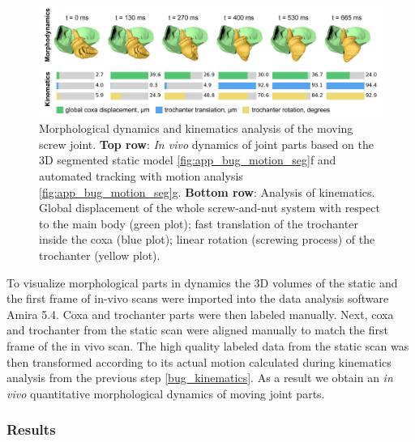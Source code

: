 \begin{figure}[ht]
  \centerline{
    \includegraphics[scale = 0.228]{figures/app_bug_kinematics.PNG} 
  }  
  \caption{Morphological dynamics and kinematics analysis of the moving screw joint. \textbf{Top row}: \textit{In vivo} dynamics of joint parts based on the 3D segmented static model \ref{fig:app_bug_motion_seg}f and automated tracking with motion analysis \ref{fig:app_bug_motion_seg}g. \textbf{Bottom row}: Analysis of kinematics. Global
displacement of the whole screw-and-nut system with respect to the main body (green plot); fast translation of the trochanter inside the coxa (blue plot);
linear rotation (screwing process) of the trochanter (yellow plot).}
  \label{fig:app_bug_kinematics}
\end{figure}

To visualize morphological parts in dynamics the 3D volumes of the static and the first frame of in-vivo scans were imported into the data analysis software Amira 5.4. Coxa and trochanter parts were then labeled manually. Next, coxa and trochanter from the static scan were aligned manually to match the first frame of the in vivo scan. The high quality labeled data from the static scan was then transformed according to its actual
motion calculated during kinematics analysis from the previous step \ref{bug_kinematics}. 
As a result we obtain an \textit{in vivo} quantitative morphological dynamics of moving joint parts.




\subsubsection{Results}


